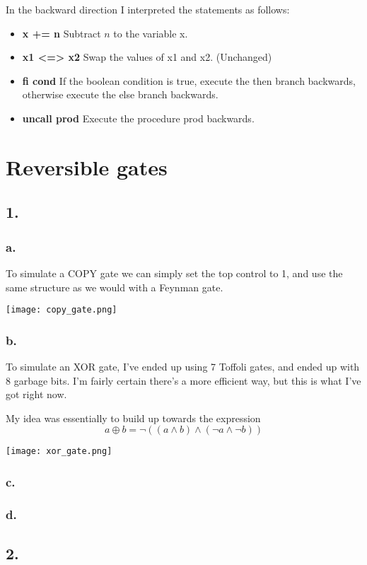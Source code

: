 \documentclass[12pt]{report}
\begin{document}
In the backward direction I interpreted the statements as follows:
\begin{itemize}
\item \textbf{ x += n } Subtract $n$ to the variable x.
\item \textbf{ x1 <=> x2 } Swap the values of x1 and x2. (Unchanged)
\item \textbf{ fi cond } If the boolean condition is true, execute the then branch backwards, otherwise execute the else branch backwards.
\item \textbf{ uncall prod } Execute the procedure prod backwards.
\end{itemize}

\section*{Reversible gates}
\subsection*{1.}
  \subsubsection*{a.}
    To simulate a COPY gate we can simply set the top control to 1, and use the same structure as we would with a Feynman gate.

    \texttt{[image: copy\_gate.png]}
  \subsubsection*{b.}
    To simulate an XOR gate, I've ended up using 7 Toffoli gates, and ended up with 8 garbage bits. I'm fairly certain there's a more efficient way, but this is what I've got right now.

    My idea was essentially to build up towards the expression
    $$ a\oplus b = \neg ((a \land b) \land (\neg a \land \neg b))$$

    \texttt{[image: xor\_gate.png]}
  \subsubsection*{c.}
  \subsubsection*{d.}


\subsection*{2.}
\end{document}
